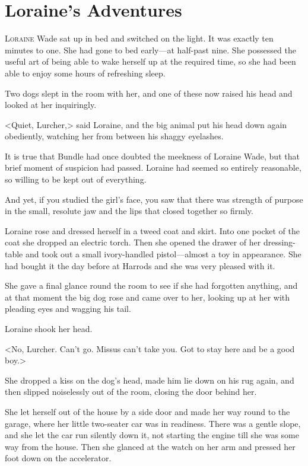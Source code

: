 \chapter{Loraine's Adventures}

\lettrine{L}{oraine} Wade sat up in bed and switched on the light. It was exactly ten minutes to one. She had gone to bed early—at half-past nine. She possessed the useful art of being able to wake herself up at the required time, so she had been able to enjoy some hours of refreshing sleep.

Two dogs slept in the room with her, and one of these now raised his head and looked at her inquiringly.

<Quiet, Lurcher,> said Loraine, and the big animal put his head down again obediently, watching her from between his shaggy eyelashes.

It is true that Bundle had once doubted the meekness of Loraine Wade, but that brief moment of suspicion had passed. Loraine had seemed so entirely reasonable, so willing to be kept out of everything.

And yet, if you studied the girl's face, you saw that there was strength of purpose in the small, resolute jaw and the lips that closed together so firmly.

Loraine rose and dressed herself in a tweed coat and skirt. Into one pocket of the coat she dropped an electric torch. Then she opened the drawer of her dressing-table and took out a small ivory-handled pistol—almost a toy in appearance. She had bought it the day before at Harrods and she was very pleased with it.

She gave a final glance round the room to see if she had forgotten anything, and at that moment the big dog rose and came over to her, looking up at her with pleading eyes and wagging his tail.

Loraine shook her head.

<No, Lurcher. Can't go. Missus can't take you. Got to stay here and be a good boy.>

She dropped a kiss on the dog's head, made him lie down on his rug again, and then slipped noiselessly out of the room, closing the door behind her.

She let herself out of the house by a side door and made her way round to the garage, where her little two-seater car was in readiness. There was a gentle slope, and she let the car run silently down it, not starting the engine till she was some way from the house. Then she glanced at the watch on her arm and pressed her foot down on the accelerator.

